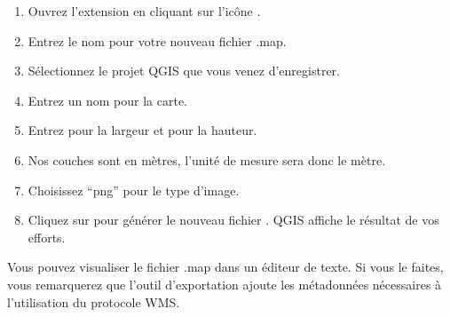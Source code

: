 
\begin{enumerate}
  \item Ouvrez l'extension en cliquant sur l'icône .
  \item Entrez le nom  pour votre nouveau fichier .map.
  \item Sélectionnez le projet QGIS  que vous venez d'enregistrer.
  \item Entrez un nom  pour la carte.
  \item Entrez  pour la largeur et  pour la hauteur.
  \item Nos couches sont en mètres, l'unité de mesure sera donc le mètre.
  \item Choisissez ``png'' pour le type d'image.
  \item Cliquez sur  pour générer le nouveau fichier . 
  QGIS affiche le résultat de vos efforts.
\end{enumerate}

Vous pouvez visualiser le fichier .map dans un éditeur de texte. Si vous le faites, vous remarquerez que l'outil d'exportation ajoute les métadonnées nécessaires à l'utilisation du protocole WMS.

